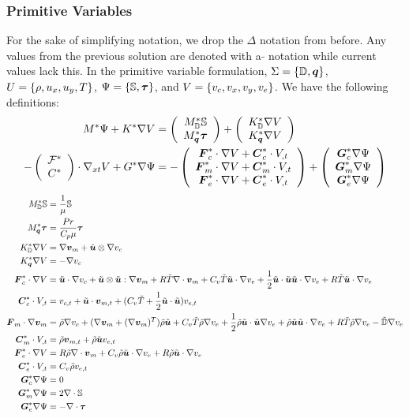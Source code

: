 \documentclass{article}
\begin{document}
\subsubsection*{Primitive Variables}
For the sake of simplifying notation, we drop the $\Delta$ notation from before. 
Any values from the previous solution are denoted with a $\tilde{}$ notation while current values lack this.
In the primitive variable formulation, $\Sigma=\left\{ \mathbb{D},\boldsymbol q \right\}$, $U=\left\{ \rho,u_x,u_y,T \right\}$, $\Psi=\left\{ \mathbb{S},\boldsymbol\tau \right\}$, and $V=\left\{ v_c,v_x,v_y,v_e \right\}$.
We have the following definitions:
\begin{align*}
M^*\Psi+K^*\nabla V&=\left( \begin{array}{c} M_{\mathbb{D}}^*\mathbb{S}\\ M_{\boldsymbol q}^*\boldsymbol\tau\\ \end{array} \right)
+\left( \begin{array}{c} K_{\mathbb{D}}^*\nabla V\\ K_{\boldsymbol q}^*\nabla V\\ \end{array} \right)\\
-\left( \begin{array}{c} \mathcal{F}^*\\ C^*\\ \end{array} \right)\cdot\nabla_{xt} V+G^*\nabla\Psi&=-\left( \begin{array}{c} \boldsymbol F_c^*\cdot\nabla V+\boldsymbol C_c^*\cdot V_{,t}\\ \boldsymbol F_m^*\cdot\nabla V+\boldsymbol C_m^*\cdot V_{,t}\\ \boldsymbol F_e^*\cdot\nabla V+\boldsymbol C_e^*\cdot V_{,t}\\ \end{array} \right)
+\left( \begin{array}{c} \boldsymbol G_c^*\nabla\Psi\\ \boldsymbol G_m^*\nabla\Psi\\ \boldsymbol G_e^*\nabla\Psi\\ \end{array} \right)
\end{align*}
\begin{align*}
M_\mathbb{D}^*\mathbb{S}&=\frac{1}{\mu}\mathbb{S}\\
M_{\bfq}^*\bftau&=\frac{Pr}{C_p\mu}\bftau\\
K_\mathbb{D}^*\Grad V&=\Grad\bfv_m+\tilde\bfu\otimes\Grad v_e\\
K_{\bfq}^*\Grad V&=-\Grad v_e\\
\bfF_c^*\cdot\Grad V&=
\tilde\bfu\cdot\Grad v_c
+\tilde\bfu\otimes\tilde\bfu:\Grad\bfv_m+R\tilde T\Div\bfv_m
+C_v\tilde T\tilde\bfu\cdot\Grad v_e+\frac{1}{2}\tilde\bfu\cdot\tilde\bfu\tilde\bfu\cdot\Grad v_e+R\tilde T\tilde\bfu\cdot\Grad v_e\\
%
\bfC_c^*\cdot V_{,t}&=v_{c,t}+\tilde\bfu\cdot\bfv_{m,t}+(C_v\tilde T+\frac{1}{2}\tilde\bfu\cdot\tilde\bfu)v_{e,t}\\
%
\bfF_m\cdot\Grad\bfv_m&=\tilde\rho\Grad v_c
+(\Grad\bfv_m+(\Grad\bfv_m)^T)\tilde\rho\tilde\bfu
+C_v\tilde T\tilde\rho\Grad v_e+\frac{1}{2}\tilde\rho\tilde\bfu\cdot\tilde\bfu\Grad v_e+\tilde\rho\tilde\bfu\tilde\bfu\cdot\Grad v_e
+R\tilde T\tilde\rho\Grad v_e-\tilde{\mathbb{D}}\Grad v_e
\\
%
\bfC_m^*\cdot V_{,t}&=\tilde\rho\bfv_{m,t}+\tilde\rho\tilde\bfu v_{e,t}\\
%
\bfF_e^*\cdot\Grad V&=R\tilde\rho\Div\bfv_m+C_v\tilde\rho\tilde\bfu\cdot\Grad v_e+R\tilde\rho\tilde\bfu\cdot\Grad v_e\\
%
\bfC_e^*\cdot V_{,t}&=C_v\tilde\rho v_{e,t}\\
%
\bfG_c^*\Grad\Psi&=0\\
%
\bfG_m^*\Grad\Psi&=2\Div\mathbb{S}\\
%
\bfG_e^*\Grad\Psi&=-\Div\bftau
\end{align*}
\end{document}
